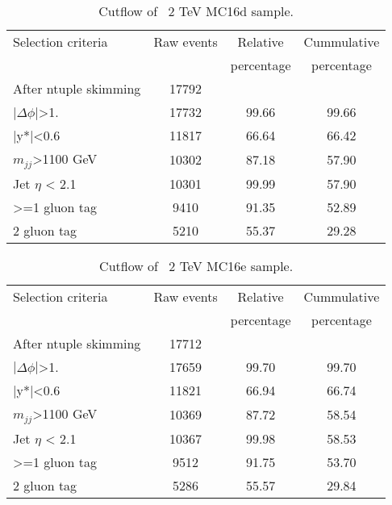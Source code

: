 \begin{table}[ht]
\begin{center}
\begin{tabular}{|l|c|c|c|}
\hline
Selection criteria & Raw events &  Relative & Cummulative \\
 & & percentage & percentage \\
\hline
After ntuple skimming & 17792 &  &  \\
$|\Delta\phi|$>1. & 17732 & 99.66 & 99.66 \\
|y*|<0.6 & 11817 & 66.64 & 66.42 \\
$m_{jj}$>1100 GeV & 10302 & 87.18 & 57.90 \\
Jet $\eta$ < 2.1 & 10301 & 99.99 & 57.90 \\
>=1 gluon tag & 9410 & 91.35 & 52.89 \\
2 gluon tag & 5210 & 55.37 & 29.28 \\
\hline
\end{tabular}
\end{center}
\caption{Cutflow of \Hprime\ 2 TeV MC16d sample.}
\end{table}

\begin{table}[ht]
\begin{center}
\begin{tabular}{|l|c|c|c|}
\hline
Selection criteria & Raw events &  Relative & Cummulative \\
 & & percentage & percentage \\
\hline
After ntuple skimming & 17712 &  &  \\
$|\Delta\phi|$>1. & 17659 & 99.70 & 99.70 \\
|y*|<0.6 & 11821 & 66.94 & 66.74 \\
$m_{jj}$>1100 GeV & 10369 & 87.72 & 58.54 \\
Jet $\eta$ < 2.1 & 10367 & 99.98 & 58.53 \\
>=1 gluon tag & 9512 & 91.75 & 53.70 \\
2 gluon tag & 5286 & 55.57 & 29.84 \\
\hline
\end{tabular}
\end{center}
\caption{Cutflow of \Hprime\ 2 TeV MC16e sample.}
\end{table}

